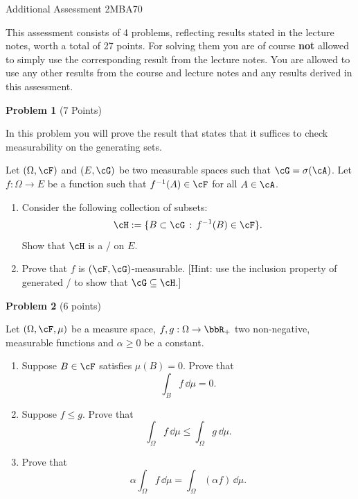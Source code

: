 \documentclass{lecturenotes}
\begin{document}
\begin{center}
	{\huge Additional Assessment 2MBA70}
\end{center}

\vspace*{10pt}

This assessment consists of 4 problems, reflecting results stated in the lecture notes, worth a total of 27 points. For solving them you are of course \textbf{not} allowed to simply use the corresponding result from the lecture notes. You are allowed to use any other results from the course and lecture notes and any results derived in this assessment. 

\vspace*{20pt}

\textbf{Problem 1} (7 Points)

In this problem you will prove the result that states that it suffices to check measurability on the generating sets.

Let $(\Omega, \cF)$ and $(E, \cG)$ be two measurable spaces such that $\cG = \sigma(\cA)$. Let $f: \Omega \to E$ be a function such that $f^{-1}(A) \in \cF$ for all $A \in \cA$.


\begin{enumerate}[label=(\alph*)]
\item Consider the following collection of subsets:
\[
	\cH := \{B \subset \cG \, : \, f^{-1}(B) \in \cF\}.
\]
Show that $\cH$ is a \sigalg/ on $E$.
\item Prove that $f$ is $(\cF, \cG)$-measurable. [Hint: use the inclusion property of generated \sigalgs/ to show that $\cG \subseteq \cH$.]
\end{enumerate}

\textbf{Problem 2} (6 points)

Let $(\Omega, \cF, \mu)$ be a measure space, $f, g : \Omega \to \bbR_+$ two non-negative, measurable functions and $\alpha \geq 0$ be a constant. 

\begin{enumerate}[label=(\alph*)]
\item Suppose $B \in \cF$ satisfies $\mu(B) = 0$. Prove that
		\[
		\int_{B} f\, \dd \mu = 0. 
		\]
\item Suppose $f \leq g$. Prove that
		\[
		\int_\Omega f\, \dd \mu \leq \int_\Omega g\, \dd \mu.
		\]
\item Prove that
		\[
			\alpha \int_\Omega f\, \dd \mu = \int_\Omega (\alpha f )\,\dd \mu.
		\]
\end{enumerate}
\end{document}
